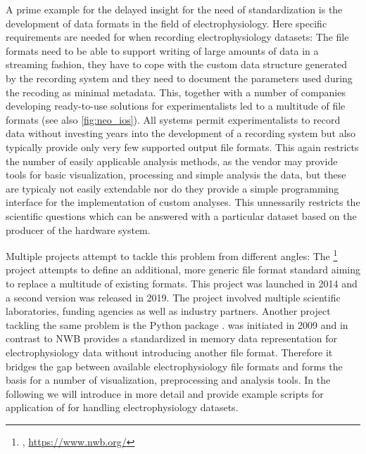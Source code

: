 A prime example for the delayed insight for the need of standardization is the development of data formats in the field of electrophysiology. Here specific requirements are needed for when recording electrophysiology datasets: The file formats need to be able to support writing of large amounts of data in a streaming fashion, they have to cope with the custom data structure generated by the recording system  and they need to document the parameters used during the recoding as minimal metadata. This, together with a number of companies developing ready-to-use solutions for experimentalists led to a multitude of file formats (see also \cref{fig:neo_ios}). All systems permit experimentalists to record data without investing years into the development of a recording system but also typically provide only very few supported output file formats. This again restricts the number of easily applicable analysis methods, as the vendor may provide tools for basic visualization, processing and simple analysis the data, but these are typicaly not easily extendable nor do they provide a simple programming interface for the implementation of custom analyses. This unnessarily restricts the scientific questions which can be answered with a particular dataset based on the producer of the hardware system.

Multiple projects attempt to tackle this problem from different angles: The \footnote{, \url{https://www.nwb.org/}} \citep{teeters_neurodata_2015} project attempts to define an additional, more generic file format standard aiming to replace a multitude of existing formats. This project was launched in 2014 and a second version was released in 2019. The project involved multiple scientific laboratories, funding agencies as well as industry partners.
Another project tackling the same problem is the Python package .  was initiated  in 2009 and in contrast to NWB provides a standardized in memory data representation for electrophysiology data without introducing another file format. Therefore it bridges the gap between available electrophysiology file formats and forms the basis for a number of visualization, preprocessing and analysis tools. In the following we will introduce  in more detail and provide example scripts for application of  for handling electrophysiology datasets.

